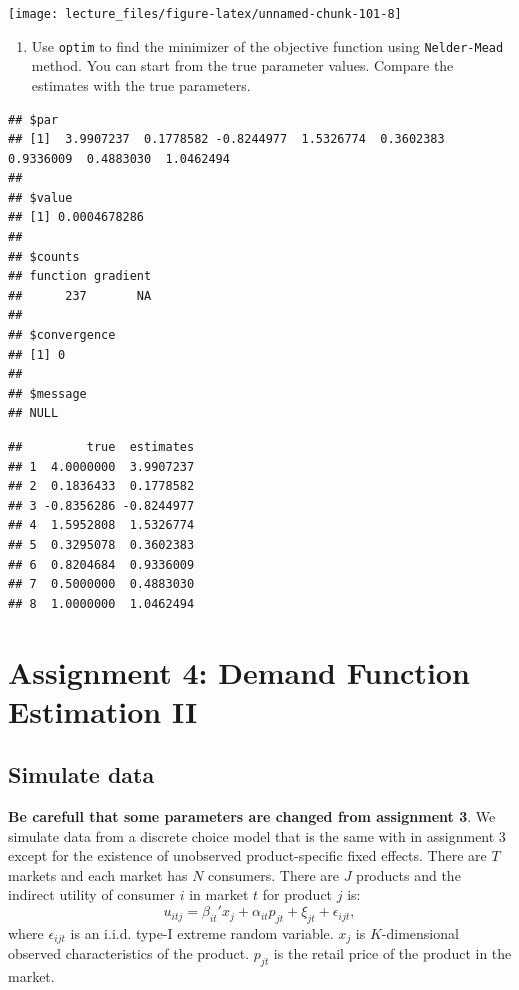 \documentclass[
]{book}
\providecommand{\tightlist}{%
  \setlength{\itemsep}{0pt}\setlength{\parskip}{0pt}}
\begin{document}
\begin{center}\texttt{[image: lecture\_files/figure-latex/unnamed-chunk-101-8]} \end{center}

\begin{enumerate}
\def\labelenumi{\arabic{enumi}.}
\setcounter{enumi}{7}
\tightlist
\item
  Use \texttt{optim} to find the minimizer of the objective function using \texttt{Nelder-Mead} method. You can start from the true parameter values. Compare the estimates with the true parameters.
\end{enumerate}

\begin{verbatim}
## $par
## [1]  3.9907237  0.1778582 -0.8244977  1.5326774  0.3602383  0.9336009  0.4883030  1.0462494
## 
## $value
## [1] 0.0004678286
## 
## $counts
## function gradient 
##      237       NA 
## 
## $convergence
## [1] 0
## 
## $message
## NULL
\end{verbatim}

\begin{verbatim}
##         true  estimates
## 1  4.0000000  3.9907237
## 2  0.1836433  0.1778582
## 3 -0.8356286 -0.8244977
## 4  1.5952808  1.5326774
## 5  0.3295078  0.3602383
## 6  0.8204684  0.9336009
## 7  0.5000000  0.4883030
## 8  1.0000000  1.0462494
\end{verbatim}

\hypertarget{assignment4}{%
\chapter{Assignment 4: Demand Function Estimation II}\label{assignment4}}

\hypertarget{simulate-data-3}{%
\section{Simulate data}\label{simulate-data-3}}

\textbf{Be carefull that some parameters are changed from assignment 3}. We simulate data from a discrete choice model that is the same with in assignment 3 except for the existence of unobserved product-specific fixed effects. There are \(T\) markets and each market has \(N\) consumers. There are \(J\) products and the indirect utility of consumer \(i\) in market \(t\) for product \(j\) is:
\[
u_{itj} = \beta_{it}' x_j + \alpha_{it} p_{jt} + \xi_{jt} + \epsilon_{ijt},
\]
where \(\epsilon_{ijt}\) is an i.i.d. type-I extreme random variable. \(x_j\) is \(K\)-dimensional observed characteristics of the product. \(p_{jt}\) is the retail price of the product in the market.
\end{document}
